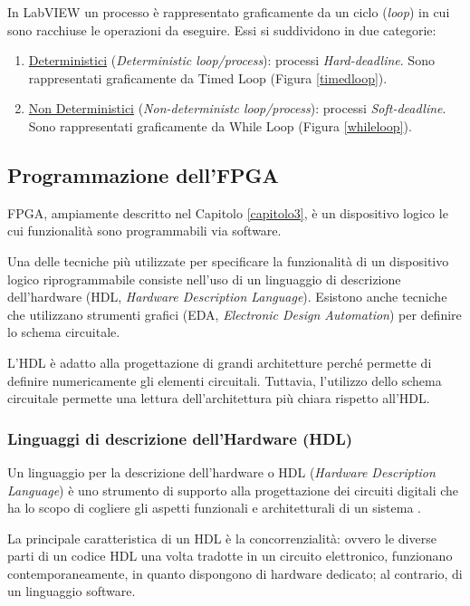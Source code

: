 In LabVIEW un processo è rappresentato graficamente da un ciclo (\textit{loop}) in cui sono racchiuse le operazioni da eseguire. Essi si suddividono in due categorie:
\begin{enumerate}
	\item \underline{Deterministici} (\textit{Deterministic loop/process}): processi \textit{Hard-deadline}. Sono rappresentati graficamente da Timed Loop (Figura \ref{timedloop}).
	\item \underline{Non Deterministici} (\textit{Non-deterministc loop/process}): processi \textit{Soft-deadline}. Sono rappresentati graficamente da While Loop (Figura \ref{whileloop}).
\end{enumerate}

\subsection{Programmazione dell'FPGA}
FPGA, ampiamente descritto nel Capitolo \ref{capitolo3}, è un dispositivo logico le cui funzionalità sono programmabili via software.

Una delle tecniche più utilizzate per specificare la funzionalità di un dispositivo logico riprogrammabile consiste nell'uso di un linguaggio di descrizione dell'hardware (HDL, \textit{Hardware Description Language}). Esistono anche tecniche che utilizzano strumenti grafici (EDA, \textit{Electronic Design Automation}) per definire lo schema circuitale.

L'HDL è adatto alla progettazione di grandi architetture perché permette di definire numericamente gli elementi circuitali. Tuttavia, l'utilizzo dello schema circuitale permette una lettura dell'architettura più chiara rispetto all'HDL.

\subsubsection{Linguaggi di descrizione dell'Hardware (HDL)}
Un linguaggio per la descrizione dell'hardware o HDL (\textit{Hardware Description Language}) è uno strumento di supporto alla progettazione dei circuiti digitali che ha lo scopo di cogliere gli aspetti funzionali e architetturali di un sistema \cite{fornacia}.

La principale caratteristica di un HDL è la concorrenzialità: ovvero le diverse parti di un codice HDL una volta tradotte in un circuito elettronico, funzionano contemporaneamente, in quanto dispongono di hardware dedicato; al contrario, di un linguaggio software.

